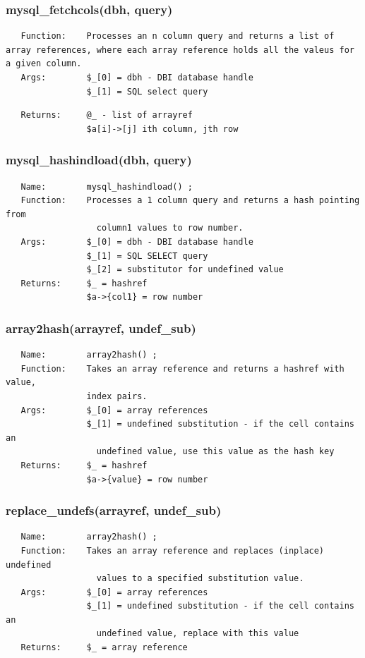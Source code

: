 \documentclass{article}
\begin{document}
\subsubsection*{mysql\_fetchcols(dbh, query)\label{pibase_pm_mysql_fetchcols_dbh_query_}}
\begin{verbatim}
   Function:    Processes an n column query and returns a list of array references, where each array reference holds all the valeus for a given column.
   Args:        $_[0] = dbh - DBI database handle
                $_[1] = SQL select query
\end{verbatim}
\begin{verbatim}
   Returns:     @_ - list of arrayref
                $a[i]->[j] ith column, jth row
\end{verbatim}
\subsubsection*{mysql\_hashindload(dbh, query)\label{pibase_pm_mysql_hashindload_dbh_query_}}
\begin{verbatim}
   Name:        mysql_hashindload() ;
   Function:    Processes a 1 column query and returns a hash pointing from
                  column1 values to row number.
   Args:        $_[0] = dbh - DBI database handle
                $_[1] = SQL SELECT query
                $_[2] = substitutor for undefined value
   Returns:     $_ = hashref
                $a->{col1} = row number
\end{verbatim}
\subsubsection*{array2hash(arrayref, undef\_sub)\label{pibase_pm_array2hash_arrayref_undef_sub_}}
\begin{verbatim}
   Name:        array2hash() ;
   Function:    Takes an array reference and returns a hashref with value,
                index pairs.
   Args:        $_[0] = array references
                $_[1] = undefined substitution - if the cell contains an
                  undefined value, use this value as the hash key
   Returns:     $_ = hashref
                $a->{value} = row number
\end{verbatim}
\subsubsection*{replace\_undefs(arrayref, undef\_sub)\label{pibase_pm_replace_undefs_arrayref_undef_sub_}}
\begin{verbatim}
   Name:        array2hash() ;
   Function:    Takes an array reference and replaces (inplace) undefined
                  values to a specified substitution value.
   Args:        $_[0] = array references
                $_[1] = undefined substitution - if the cell contains an
                  undefined value, replace with this value
   Returns:     $_ = array reference
\end{verbatim}
\end{document}
